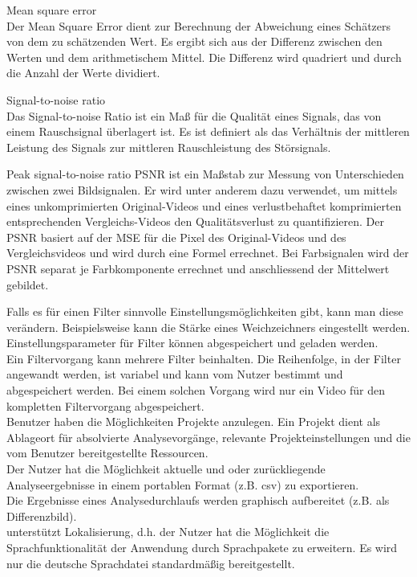 \begin{compactitem}
\item Mean square error \\
Der Mean Square Error dient zur Berechnung der Abweichung eines Schätzers von dem zu schätzenden Wert. Es ergibt sich aus der Differenz zwischen den Werten und dem arithmetischem Mittel. Die Differenz wird quadriert und durch die Anzahl der Werte dividiert.
\item Signal-to-noise ratio \\
Das Signal-to-noise Ratio ist ein Maß für die Qualität eines Signals, das von einem Rauschsignal überlagert ist. Es ist definiert als das Verhältnis der mittleren Leistung des Signals zur mittleren Rauschleistung des Störsignals.
\item Peak signal-to-noise ratio
PSNR ist ein Maßstab zur Messung von Unterschieden zwischen zwei Bildsignalen. Er wird unter anderem dazu verwendet, um mittels eines unkomprimierten Original-Videos und eines verlustbehaftet komprimierten entsprechenden Vergleichs-Videos den Qualitätsverlust zu quantifizieren. Der PSNR basiert auf der MSE für die Pixel des Original-Videos und des Vergleichsvideos und wird durch eine Formel errechnet. Bei Farbsignalen wird der PSNR separat je Farbkomponente errechnet und anschliessend der Mittelwert gebildet.
\end{compactitem}
 Falls es für einen Filter sinnvolle Einstellungsmöglichkeiten gibt, kann man diese verändern. Beispielsweise kann die Stärke eines Weichzeichners eingestellt werden.\\
 Einstellungsparameter für Filter können abgespeichert und geladen werden.\\
 Ein Filtervorgang kann mehrere Filter beinhalten. Die Reihenfolge, in der Filter angewandt
werden, ist variabel und kann vom Nutzer bestimmt und abgespeichert werden. Bei einem solchen Vorgang wird nur ein Video für den kompletten Filtervorgang abgespeichert.\\
 Benutzer haben die Möglichkeiten Projekte anzulegen. Ein Projekt dient als Ablageort für
absolvierte Analysevorgänge, relevante Projekteinstellungen und die vom Benutzer bereitgestellte Ressourcen.\\
 Der Nutzer hat die Möglichkeit aktuelle und oder zurückliegende Analyseergebnisse in einem portablen Format (z.B. \gls{csv}) zu exportieren.\\
 Die Ergebnisse eines Analysedurchlaufs werden graphisch aufbereitet (z.B. als Differenzbild).\\
 \projektTitel unterstützt Lokalisierung, d.h. der Nutzer hat die Möglichkeit die Sprachfunktionalität der Anwendung durch Sprachpakete zu erweitern. Es wird nur die deutsche Sprachdatei standardmäßig bereitgestellt.

